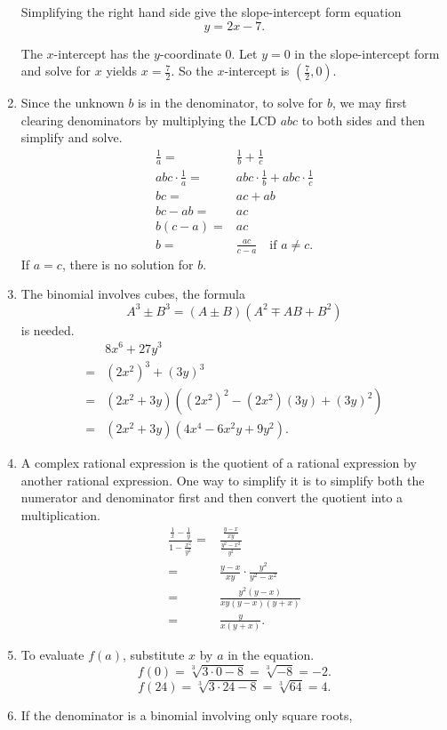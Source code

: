 \documentclass[
  12pt]{article}
\begin{document}
\begin{enumerate}
  Simplifying the right hand side give the slope-intercept form equation
  \[y=2x-7.\]

  The \(x\)-intercept has the \(y\)-coordinate \(0\). Let \(y=0\) in the
  slope-intercept form and solve for \(x\) yields \(x=\frac72\). So the
  \(x\)-intercept is \(\left(\frac{7}{2},0\right)\).
\item
  Since the unknown \(b\) is in the denominator, to solve for \(b\), we
  may first clearing denominators by multiplying the LCD \(abc\) to both
  sides and then simplify and solve. \[
  \begin{aligned}
  \frac1a=&\frac1b+\frac1c\\
  abc\cdot\frac1a=&abc\cdot\frac1b+abc\cdot\frac1c\\
  bc=&ac+ab\\
  bc-ab=&ac\\
  b(c-a)=&ac\\
  b=&\frac{ac}{c-a}\quad\text{if }a\ne c.
  \end{aligned}
  \] If \(a=c\), there is no solution for \(b\).
\item
  The binomial involves cubes, the formula
  \[A^3\pm B^3=(A\pm B)(A^2\mp AB+B^2)\] is needed. \[
  \begin{aligned}
  &8x^6+27y^3\\
  =&(2x^2)^3+(3y)^3\\
  =&(2x^2 + 3y)((2x^2)^2-(2x^2)(3y)+(3y)^2)\\
  =&(2x^2 + 3y)(4x^4-6x^2y+9y^2).
  \end{aligned}
  \]
\item
  A complex rational expression is the quotient of a rational expression
  by another rational expression. One way to simplify it is to simplify
  both the numerator and denominator first and then convert the quotient
  into a multiplication. \[
  \begin{aligned}
  \frac{\frac1x-\frac1y}{1-\frac{x^2}{y^2}}
  =&\frac{\frac{y-x}{xy}}{\frac{y^2-x^2}{y^2}}\\
  =&\frac{y-x}{xy}\cdot\frac{y^2}{y^2-x^2}\\
  =&\frac{y^2(y-x)}{xy(y-x)(y+x)}\\
  =&\frac{y}{x(y+x)}.
  \end{aligned}
  \]
\item
  To evaluate \(f(a)\), substitute \(x\) by \(a\) in the equation.
  \[f(0)=\sqrt[3]{3\cdot 0-8}=\sqrt[3]{-8}=-2.\]
  \[f(24)=\sqrt[3]{3\cdot 24-8}=\sqrt[3]{64}=4.\]
\item
  If the denominator is a binomial involving only square roots,

\end{enumerate}
\end{document}

